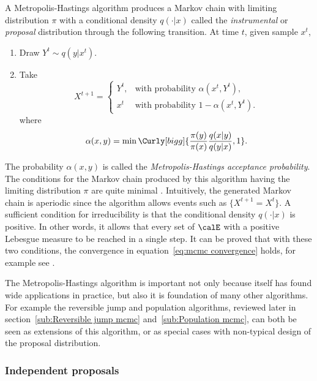 A Metropolis-Hastings algorithm produces a Markov chain with limiting
distribution $\pi$ with a conditional density $q(\cdot|x)$ called the
\emph{instrumental} or \emph{proposal} distribution through the following
transition. At time $t$, given sample $x^t$,
\begin{enumerate}
  \item Draw $Y^t \sim q(y|x^t)$.
  \item Take
    \begin{equation*}
      X^{t+1} =
      \begin{cases}
        Y^t, &\text{with probability } \alpha(x^t,Y^t),\\
        x^t  &\text{with probability } 1 - \alpha(x^t,Y^t).
      \end{cases}
    \end{equation*}
    where
    \begin{equation}
      \alpha(x,y) =
      \min\Curly[bigg]{\frac{\pi(y)}{\pi(x)}\frac{q(x|y)}{q(y|x)},1}.
    \end{equation}
\end{enumerate}
The probability $\alpha(x,y)$ is called the \emph{Metropolis-Hastings
  acceptance probability}. The conditions for the Markov chain produced by
this algorithm having the limiting distribution $\pi$ are quite minimal
\cite[][sec.~7.3.2]{Robert:2004tn}. Intuitively, the generated Markov chain is
aperiodic since the algorithm allows events such as $\{X^{t+1} = X^t\}$. A
sufficient condition for irreducibility is that the conditional density
$q(\cdot|x)$ is positive. In other words, it allows that every set of $\calE$
with a positive Lebesgue measure to be reached in a single step. It can be
proved that with these two conditions, the convergence in
equation~\eqref{eq:mcmc convergence} holds, for example see
\cite[][Theorem~7.4 and Corollary~7.5]{Robert:2004tn}.

The Metropolis-Hastings algorithm is important not only because itself has
found wide applications in practice, but also it is foundation of many other
algorithms. For example the reversible jump \mcmc and population \mcmc
algorithms, reviewed later in section~\ref{sub:Reversible jump mcmc}
and~\ref{sub:Population mcmc}, can both be seen as extensions of this
algorithm, or as special cases with non-typical design of the proposal
distribution.

\subsubsection{Independent proposals}
\label{ssub:Independent proposals}

